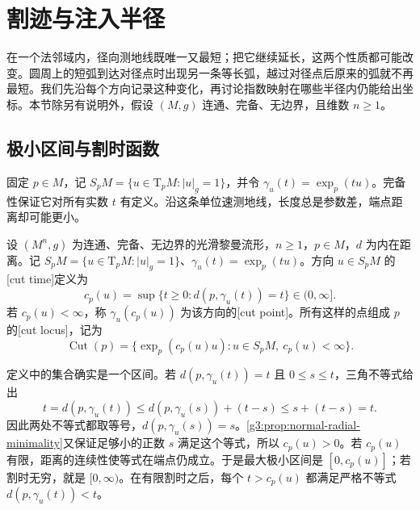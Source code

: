 
% 
% 
% 

\section{割迹与注入半径}
\label{g3:sec:0204}

在一个法邻域内，径向测地线既唯一又最短；把它继续延长，这两个性质都可能改变。圆周上的短弧到达对径点时出现另一条等长弧，越过对径点后原来的弧就不再最短。我们先沿每个方向记录这种变化，再讨论指数映射在哪些半径内仍能给出坐标。本节除另有说明外，假设 \((M,g)\) 连通、完备、无边界，且维数 \(n\ge1\)。

\subsection{极小区间与割时函数}
\label{g3:subsec:0204:01}
固定 \(p\in M\)，记 \(S_pM=\{u\in \mathrm{T}_pM:|u|_g=1\}\)，并令 \(\gamma_u(t)=\exp_p(tu)\)。完备性保证它对所有实数 \(t\) 有定义。沿这条单位速测地线，长度总是参数差，端点距离却可能更小。

\begin{definition}[割时与割迹]\label{g3:def:cut-time}
	设 \((M^n,g)\) 为连通、完备、无边界的光滑黎曼流形，\(n\ge1\)，\(p\in M\)，\(d\) 为内在距离。记 \(S_pM=\{u\in\mathrm T_pM:|u|_g=1\}\)、\(\gamma_u(t)=\exp_p(tu)\)。方向 \(u\in S_pM\) 的[cut time]定义为
	\[
		c_p(u)=\sup\{t\ge0:d(p,\gamma_u(t))=t\}\in(0,\infty].
	\]
	若 \(c_p(u)<\infty\)，称 \(\gamma_u(c_p(u))\) 为该方向的[cut point]。所有这样的点组成 \(p\) 的[cut locus]，记为
	\[
		\operatorname{Cut}(p)=\{\exp_p(c_p(u)u):u\in S_pM,\ c_p(u)<\infty\}.
	\]
\end{definition}

定义中的集合确实是一个区间。若 \(d(p,\gamma_u(t))=t\) 且 \(0\le s\le t\)，三角不等式给出
\[
	t=d(p,\gamma_u(t))\le d(p,\gamma_u(s))+(t-s)\le s+(t-s)=t.
\]
因此两处不等式都取等号，\(d(p,\gamma_u(s))=s\)。\cref{g3:prop:normal-radial-minimality}又保证足够小的正数 \(s\) 满足这个等式，所以 \(c_p(u)>0\)。若 \(c_p(u)\) 有限，距离的连续性使等式在端点仍成立。于是最大极小区间是 \([0,c_p(u)]\)；若割时无穷，就是 \([0,\infty)\)。在有限割时之后，每个 \(t>c_p(u)\) 都满足严格不等式 \(d(p,\gamma_u(t))<t\)。

